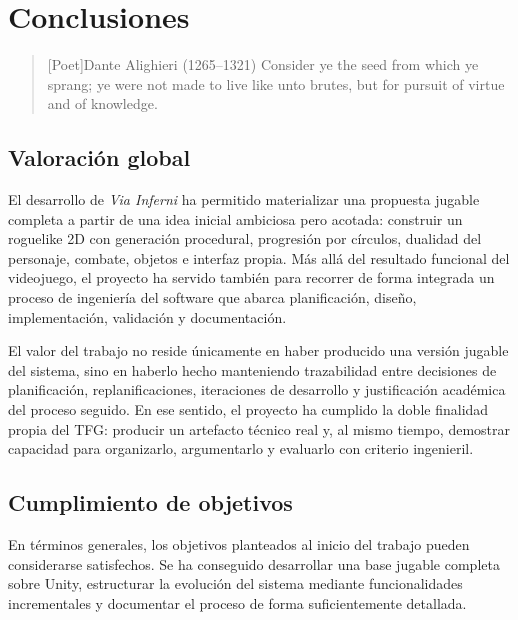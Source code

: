 \chapter{Conclusiones}

\begin{quotation}[Poet]{Dante Alighieri (1265--1321)}
Consider ye the seed from which ye sprang; ye were not made to live like unto brutes, but for pursuit of virtue and of knowledge.
\end{quotation}

\begin{abstract}
Este capítulo recoge la valoración final del proyecto, sintetizando el aprendizaje
obtenido durante el desarrollo y señalando las líneas de mejora que quedan abiertas.
\end{abstract}

\section{Valoración global}
El desarrollo de \textit{Via Inferni} ha permitido materializar una propuesta jugable
completa a partir de una idea inicial ambiciosa pero acotada: construir un roguelike 2D con
generación procedural, progresión por círculos, dualidad del personaje, combate, objetos e
interfaz propia. Más allá del resultado funcional del videojuego, el proyecto ha servido
también para recorrer de forma integrada un proceso de ingeniería del software que abarca
planificación, diseño, implementación, validación y documentación.

El valor del trabajo no reside únicamente en haber producido una versión jugable del sistema,
sino en haberlo hecho manteniendo trazabilidad entre decisiones de planificación,
replanificaciones, iteraciones de desarrollo y justificación académica del proceso seguido.
En ese sentido, el proyecto ha cumplido la doble finalidad propia del TFG: producir un
artefacto técnico real y, al mismo tiempo, demostrar capacidad para organizarlo,
argumentarlo y evaluarlo con criterio ingenieril.

\section{Cumplimiento de objetivos}
En términos generales, los objetivos planteados al inicio del trabajo pueden considerarse
satisfechos. Se ha conseguido desarrollar una base jugable completa sobre Unity, estructurar
la evolución del sistema mediante funcionalidades incrementales y documentar el proceso de
forma suficientemente detallada.

